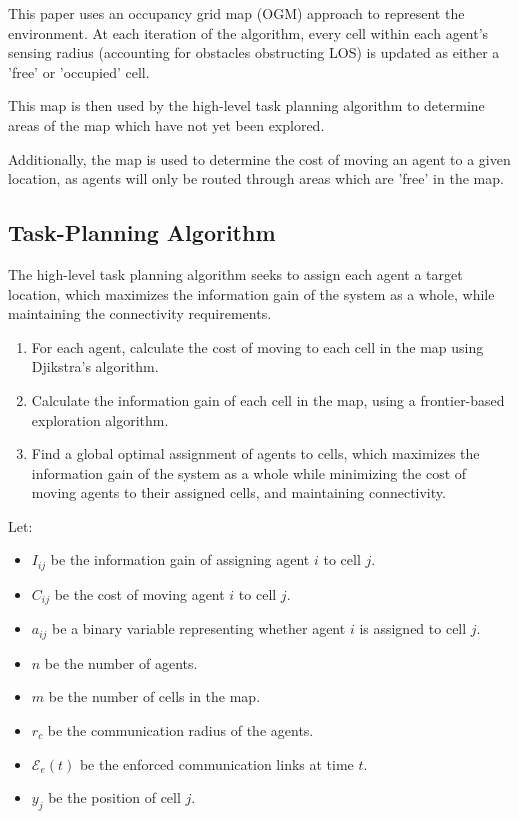 \documentclass[conference]{IEEEtran}
\begin{document}
This paper uses an occupancy grid map (OGM) approach to represent the environment. At each iteration of the algorithm,
every cell within each agent's sensing radius (accounting for obstacles obstructing LOS) is updated as either a 'free' or 'occupied' cell.

This map is then used by the high-level task planning algorithm to determine areas of the map which have not yet been explored.

Additionally, the map is used to determine the cost of moving an agent to a given location, as agents will only be routed through areas
which are 'free' in the map.


\subsection{Task-Planning Algorithm}
The high-level task planning algorithm seeks to assign each agent a target location, which maximizes the information gain of the system 
as a whole, while maintaining the connectivity requirements.


\begin{enumerate}
    \item For each agent, calculate the cost of moving to each cell in the map using Djikstra's algorithm.
    \item Calculate the information gain of each cell in the map, using a frontier-based exploration algorithm.
    \item Find a global optimal assignment of agents to cells, which maximizes the information gain of the system as a whole while
    minimizing the cost of moving agents to their assigned cells, and maintaining connectivity.
\end{enumerate}

Let:
\begin{itemize}
    \item $I_{ij}$ be the information gain of assigning agent $i$ to cell $j$.
    \item $C_{ij}$ be the cost of moving agent $i$ to cell $j$.
    \item $a_{ij}$ be a binary variable representing whether agent $i$ is assigned to cell $j$.
    \item $n$ be the number of agents.
    \item $m$ be the number of cells in the map.
    \item $r_c$ be the communication radius of the agents.
    \item $\mathcal E_e(t)$ be the enforced communication links at time $t$.
    \item $y_j$ be the position of cell $j$.
\end{itemize}
\end{document}
